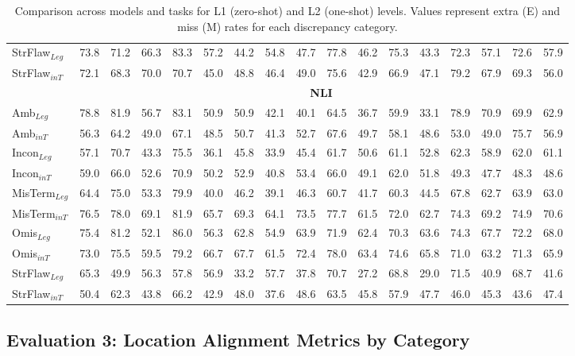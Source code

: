 \documentclass[11pt]{article}
\begin{document}
\begin{table}[h!]
\begin{tabular}{l|cccc|cccc|cccc|cccc}
StrFlaw$_{Leg}$ & 73.8 & 71.2 & 66.3 & 83.3 & 57.2 & 44.2 & 54.8 & 47.7 & 77.8 & 46.2 & 75.3 & 43.3 & 72.3 & 57.1 & 72.6 & 57.9 \\
StrFlaw$_{inT}$ & 72.1 & 68.3 & 70.0 & 70.7 & 45.0 & 48.8 & 46.4 & 49.0 & 75.6 & 42.9 & 66.9 & 47.1 & 79.2 & 67.9 & 69.3 & 56.0 \\
\cmidrule{1-17}
\rowcolor{lightestgray}
\cellcolor{white} & \multicolumn{16}{c}{\textbf{NLI}} \\
Amb$_{Leg}$ & 78.8 & 81.9 & 56.7 & 83.1 & 50.9 & 50.9 & 42.1 & 40.1 & 64.5 & 36.7 & 59.9 & 33.1 & 78.9 & 70.9 & 69.9 & 62.9 \\
Amb$_{inT}$ & 56.3 & 64.2 & 49.0 & 67.1 & 48.5 & 50.7 & 41.3 & 52.7 & 67.6 & 49.7 & 58.1 & 48.6 & 53.0 & 49.0 & 75.7 & 56.9 \\
Incon$_{Leg}$ & 57.1 & 70.7 & 43.3 & 75.5 & 36.1 & 45.8 & 33.9 & 45.4 & 61.7 & 50.6 & 61.1 & 52.8 & 62.3 & 58.9 & 62.0 & 61.1 \\
Incon$_{inT}$ & 59.0 & 66.0 & 52.6 & 70.9 & 50.2 & 52.9 & 40.8 & 53.4 & 66.0 & 49.1 & 62.0 & 51.8 & 49.3 & 47.7 & 48.3 & 48.6 \\
MisTerm$_{Leg}$ & 64.4 & 75.0 & 53.3 & 79.9 & 40.0 & 46.2 & 39.1 & 46.3 & 60.7 & 41.7 & 60.3 & 44.5 & 67.8 & 62.7 & 63.9 & 63.0 \\
MisTerm$_{inT}$ & 76.5 & 78.0 & 69.1 & 81.9 & 65.7 & 69.3 & 64.1 & 73.5 & 77.7 & 61.5 & 72.0 & 62.7 & 74.3 & 69.2 & 74.9 & 70.6 \\
Omis$_{Leg}$ & 75.4 & 81.2 & 52.1 & 86.0 & 56.3 & 62.8 & 54.9 & 63.9 & 71.9 & 62.4 & 70.3 & 63.6 & 74.3 & 67.7 & 72.2 & 68.0 \\
Omis$_{inT}$ & 73.0 & 75.5 & 59.5 & 79.2 & 66.7 & 67.7 & 61.5 & 72.4 & 78.0 & 63.4 & 74.6 & 65.8 & 71.0 & 63.2 & 71.3 & 65.9 \\
StrFlaw$_{Leg}$ & 65.3 & 49.9 & 56.3 & 57.8 & 56.9 & 33.2 & 57.7 & 37.8 & 70.7 & 27.2 & 68.8 & 29.0 & 71.5 & 40.9 & 68.7 & 41.6 \\
StrFlaw$_{inT}$ & 50.4 & 62.3 & 43.8 & 66.2 & 42.9 & 48.0 & 37.6 & 48.6 & 63.5 & 45.8 & 57.9 & 47.7 & 46.0 & 45.3 & 43.6 & 47.4 \\
\hline
\end{tabular}
\caption{Comparison across models and tasks for L1 (zero-shot) and L2 (one-shot) levels. Values represent extra (E) and miss (M) rates for each discrepancy category.}
\label{tab:category_values}
\end{table}

\subsection{Evaluation 3: Location Alignment Metrics by Category}
\label{sec:appendix-eval3-location}
\end{document}
